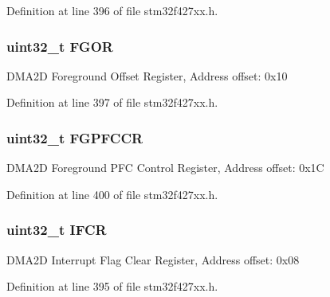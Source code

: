 Definition at line 396 of file stm32f427xx.\+h.

\subsubsection[{\texorpdfstring{F\+G\+OR}{FGOR}}]{ uint32\+\_\+t F\+G\+OR}\hypertarget{struct_d_m_a2_d___type_def_af3d84e911bbb2bf8cfa6d5e1dfe01afe}{}\label{struct_d_m_a2_d___type_def_af3d84e911bbb2bf8cfa6d5e1dfe01afe}
D\+M\+A2D Foreground Offset Register, Address offset\+: 0x10 

Definition at line 397 of file stm32f427xx.\+h.

\subsubsection[{\texorpdfstring{F\+G\+P\+F\+C\+CR}{FGPFCCR}}]{ uint32\+\_\+t F\+G\+P\+F\+C\+CR}\hypertarget{struct_d_m_a2_d___type_def_add402fd3aa4845802f08f8df79a5a72a}{}\label{struct_d_m_a2_d___type_def_add402fd3aa4845802f08f8df79a5a72a}
D\+M\+A2D Foreground P\+FC Control Register, Address offset\+: 0x1C 

Definition at line 400 of file stm32f427xx.\+h.

\subsubsection[{\texorpdfstring{I\+F\+CR}{IFCR}}]{ uint32\+\_\+t I\+F\+CR}\hypertarget{struct_d_m_a2_d___type_def_ac6f9d540fd6a21c0fbc7bfbbee9a8504}{}\label{struct_d_m_a2_d___type_def_ac6f9d540fd6a21c0fbc7bfbbee9a8504}
D\+M\+A2D Interrupt Flag Clear Register, Address offset\+: 0x08 

Definition at line 395 of file stm32f427xx.\+h.

